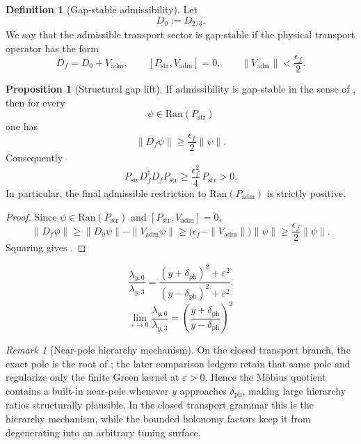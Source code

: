 \documentclass[11pt,a4paper]{article}
\theoremstyle{definition}
\newtheorem{definition}[theorem]{Definition}
\newtheorem{proposition}[theorem]{Proposition}
\theoremstyle{remark}
\newtheorem*{remark}{Remark}
\newcommand{\Padm}{P_{\mathrm{adm}}}
\begin{document}
\begin{definition}[Gap-stable admissibility]
\label{def:gap-stable-admissibility}
Let
\[
D_0:=D_{2/3}.
\]
We say that the admissible transport sector is gap-stable if the physical transport operator has the form
\[
D_f=D_0+V_{\mathrm{adm}},
\qquad
[P_{\mathrm{str}},V_{\mathrm{adm}}]=0,
\qquad
\|V_{\mathrm{adm}}\|<\frac{\epsilon_f}{2}.
\]
\end{definition}

\begin{proposition}[Structural gap lift]
\label{prop:gap-lift-full-operator}
If admissibility is gap-stable in the sense of , then for every
\[
\psi\in\mathrm{Ran}(P_{\mathrm{str}})
\]
one has
\[
\|D_f\psi\|
\ge
\frac{\epsilon_f}{2}\|\psi\|.
\]
Consequently
\begin{equation}
\label{eq:gap-lift-full-operator}
P_{\mathrm{str}} D_f^\dagger D_f P_{\mathrm{str}}
\ge
\frac{\epsilon_f^2}{4}\,P_{\mathrm{str}}
>
0.
\end{equation}
In particular, the final admissible restriction to $\mathrm{Ran}(\Padm)$ is strictly positive.
\end{proposition}

\begin{proof}
Since $\psi\in\mathrm{Ran}(P_{\mathrm{str}})$ and $[P_{\mathrm{str}},V_{\mathrm{adm}}]=0$,
\[
\|D_f\psi\|
\ge
\|D_0\psi\|-\|V_{\mathrm{adm}}\psi\|
\ge
\bigl(\epsilon_f-\|V_{\mathrm{adm}}\|\bigr)\|\psi\|
\ge
\frac{\epsilon_f}{2}\|\psi\|.
\]
Squaring gives .
\end{proof}

\begin{equation}
\label{eq:mobius-quotient}
\frac{\lambda_{y,0}}{\lambda_{y,3}}
=
\frac{(y+\delta_{\mathrm{ph}})^2+\varepsilon^2}{(y-\delta_{\mathrm{ph}})^2+\varepsilon^2}.
\end{equation}
\[
\lim_{\varepsilon\to 0}\frac{\lambda_{y,0}}{\lambda_{y,3}}
=
\left(\frac{y+\delta_{\mathrm{ph}}}{y-\delta_{\mathrm{ph}}}\right)^2
\]
\begin{remark}[Near-pole hierarchy mechanism]
On the closed transport branch, the exact pole is the root of
; the later comparison ledgers retain that same pole and
regularize only the finite Green kernel at $\varepsilon>0$.
Hence the Möbius quotient contains a built-in near-pole whenever $y$ approaches $\delta_{\mathrm{ph}}$, making large hierarchy ratios structurally plausible. In the closed transport grammar this is the hierarchy mechanism, while the bounded holonomy factors keep it from degenerating into an arbitrary tuning surface.
\end{remark}
\end{document}
